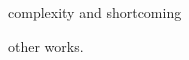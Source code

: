 \documentclass{llncs}
\begin{document}
complexity and shortcoming

other works.




\newpage

% 
\end{document}
